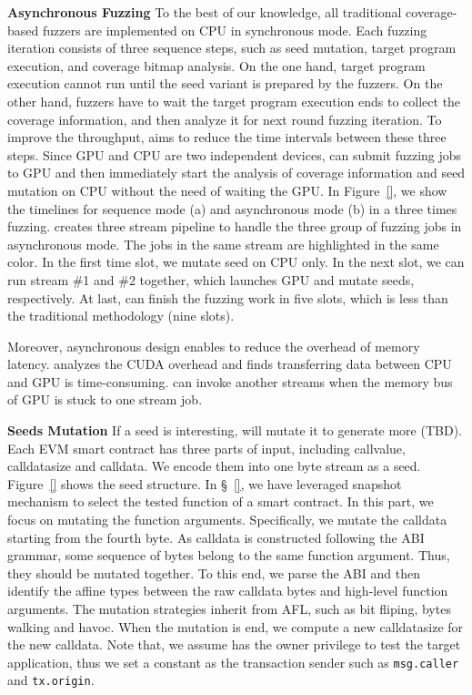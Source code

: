 \noindent \textbf{Asynchronous Fuzzing}
\label{design:asynchronous}
To the best of our knowledge, all traditional coverage-based fuzzers are implemented on CPU in synchronous mode. Each fuzzing iteration consists of three sequence steps, such as seed mutation, target program execution, and coverage bitmap analysis. 
On the one hand, target program execution cannot run until the seed variant is prepared by the fuzzers. 
On the other hand, fuzzers have to wait the target program execution ends to collect the coverage information, and then analyze it for next round fuzzing iteration. 
%
To improve the throughput, {\tool} aims to reduce the time intervals between these three steps.
%
Since GPU and CPU are two independent devices, {\runner} can submit fuzzing jobs to GPU and then immediately start the analysis of coverage information and seed mutation on CPU without the need of waiting the GPU. 
In Figure~\ref{}, we show the timelines for sequence mode (a) and asynchronous mode (b) in a three times fuzzing. 
{\tool} creates three stream pipeline to handle the three group of fuzzing jobs in asynchronous mode. 
The jobs in the same stream are highlighted in the same color. 
In the first time slot, we mutate seed on CPU only. In the next slot, we can run stream \#1 and \#2 together, which launches GPU and mutate seeds, respectively. At last, {\tool} can finish the fuzzing work in five slots, which is less than the traditional methodology (nine slots).

Moreover, asynchronous design enables {\tool} to reduce the overhead of memory latency. \cite{} analyzes the CUDA overhead and finds transferring data between CPU and GPU is time-consuming. {\tool} can invoke another streams when the memory bus of GPU is stuck to one stream job. 


\noindent \textbf{Seeds Mutation}
\label{design:mutation}
If a seed is interesting, {\runner} will mutate it to generate more (TBD). 
Each EVM smart contract has three parts of input, including callvalue, calldatasize and calldata. We encode them into one byte stream as a seed. Figure~\ref{} shows the seed structure. 
%
In \S~\ref{}, we have leveraged snapshot mechanism to select the tested function of a smart contract. 
%
In this part, we focus on mutating the function arguments. Specifically, we mutate the calldata starting from the fourth byte. 
%
As calldata is constructed following the ABI grammar, some sequence of bytes belong to the same function argument. Thus, they should be mutated together.
%
To this end, we parse the ABI and then identify the affine types between the raw calldata bytes and high-level function arguments. 
%
The mutation strategies inherit from AFL, such as bit fliping, bytes walking and havoc\cite{afl}. 
When the mutation is end, we compute a new calldatasize for the new calldata. 
Note that, we assume {\tool} has the owner privilege to test the target application, thus we set a constant as the transaction sender such as \texttt{msg.caller} and \texttt{tx.origin}.

